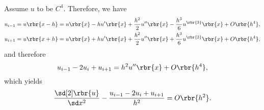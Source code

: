\documentclass[english, nochinese]{../TeXTemplate/pkupaper}
\begin{document}
\begin{thmquestion}
\
\begin{thmanswer}
Assume $u$ to be $C^4$. Therefore, we have
\begin{align}
u_{ i - 1 } &= u \rbr{ x - h } = u \rbr{x} - h u' \rbr{x} + \frac{h^2}{2} u'' \rbr{x} - \frac{h^3}{6} u^{\rbr{3}} \rbr{x} + O \rbr{h^4}, \\
u_{ i + 1 } &= u \rbr{ x + h } = u \rbr{x} + h u' \rbr{x} + \frac{h^2}{2} u'' \rbr{x} + \frac{h^3}{6} u^{\rbr{3}} \rbr{x} + O \rbr{h^4}, \\
\end{align}
and therefore
\begin{equation}
u_{ i - 1 } - 2 u_i + u_{ i + 1 } = h^2 u'' \rbr{x} + O \rbr{h^4},
\end{equation}
which yields
\begin{equation}
\frac{ \sd[2] \rbr{u} }{ \sd x^2 } - \frac{ u_{ i - 1 } - 2 u_i + u_{ i + 1 } }{h^2} = O \rbr{h^2}.
\end{equation}

\sqed
\end{thmanswer}
\end{thmquestion}
\end{document}
